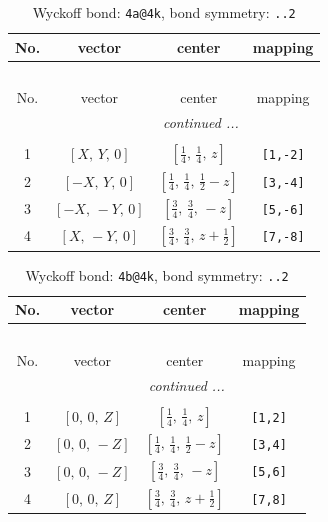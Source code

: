 \documentclass[fleqn,8pt]{jsarticle}
\begin{document}
\begin{longtable}{cccc}
\caption{Wyckoff bond: {\tt 4a@4k}, bond symmetry: {\tt ..2}}
 \\
 \hline \hline
No. & vector & center & mapping \\ \hline \endfirsthead

\multicolumn{3}{l}{\tablename\ \thetable{}} \\
 \hline \hline
No. & vector & center & mapping \\ \hline \endhead

 \hline \hline
\multicolumn{3}{r}{\footnotesize\it continued ...} \\ \endfoot

 \hline \hline
\multicolumn{3}{r}{} \\ \endlastfoot

1 & $\left[ X,\, Y,\, 0 \right]$ & $\left[ \frac{1}{4},\, \frac{1}{4},\, z \right]$ & {\tt [1,-2]} \\ \hline
2 & $\left[ - X,\, Y,\, 0 \right]$ & $\left[ \frac{1}{4},\, \frac{1}{4},\, \frac{1}{2} - z \right]$ & {\tt [3,-4]} \\ \hline
3 & $\left[ - X,\, - Y,\, 0 \right]$ & $\left[ \frac{3}{4},\, \frac{3}{4},\, - z \right]$ & {\tt [5,-6]} \\ \hline
4 & $\left[ X,\, - Y,\, 0 \right]$ & $\left[ \frac{3}{4},\, \frac{3}{4},\, z + \frac{1}{2} \right]$ & {\tt [7,-8]} \\
\end{longtable}
\renewcommand{\arraystretch}{1.2}
\begin{longtable}{cccc}
\caption{Wyckoff bond: {\tt 4b@4k}, bond symmetry: {\tt ..2}}
 \\
 \hline \hline
No. & vector & center & mapping \\ \hline \endfirsthead

\multicolumn{3}{l}{\tablename\ \thetable{}} \\
 \hline \hline
No. & vector & center & mapping \\ \hline \endhead

 \hline \hline
\multicolumn{3}{r}{\footnotesize\it continued ...} \\ \endfoot

 \hline \hline
\multicolumn{3}{r}{} \\ \endlastfoot

1 & $\left[ 0,\, 0,\, Z \right]$ & $\left[ \frac{1}{4},\, \frac{1}{4},\, z \right]$ & {\tt [1,2]} \\ \hline
2 & $\left[ 0,\, 0,\, - Z \right]$ & $\left[ \frac{1}{4},\, \frac{1}{4},\, \frac{1}{2} - z \right]$ & {\tt [3,4]} \\ \hline
3 & $\left[ 0,\, 0,\, - Z \right]$ & $\left[ \frac{3}{4},\, \frac{3}{4},\, - z \right]$ & {\tt [5,6]} \\ \hline
4 & $\left[ 0,\, 0,\, Z \right]$ & $\left[ \frac{3}{4},\, \frac{3}{4},\, z + \frac{1}{2} \right]$ & {\tt [7,8]} \\
\end{longtable}
\end{document}
